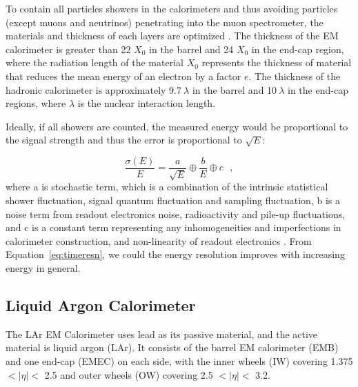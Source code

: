 \par To contain all particles showers in the calorimeters and thus avoiding particles (except muons and neutrinos) penetrating into the muon spectrometer, the materials and thickness of each layers are optimized \cite{Aad:1129811}. The thickness of the EM calorimeter is greater than 22 $X_0$ in the barrel and 24 $X_0$ in the end-cap region, where the radiation length of the material $X_0$ represents the thickness of material that reduces the mean energy of an electron by a factor $e$. The thickness of the hadronic calorimeter is approximately 9.7$~\lambda$ in the barrel and 10$~\lambda$ in the end-cap regions, where $\lambda$ is the nuclear interaction length.

\par Ideally, if all showers are counted, the measured energy would be proportional to the signal strength and thus the error is proportional to $\sqrt{E}$:

\begin{equation}
\label{eq:timeresn}
\frac{\sigma(E)}{E} = \frac{a}{\sqrt{E}} \oplus \frac{b}{E} \oplus c \ \ \  ,
\end{equation}
where a is stochastic term, which is a combination of the intrinsic statistical shower fluctuation, signal quantum fluctuation and sampling fluctuation, b is a noise term from readout electronics noise, radioactivity and pile-up fluctuations, and c is a constant term representing any inhomogeneities and imperfections in calorimeter construction, and non-linearity of readout electronics \cite{calorimetry}. From Equation~\ref{eq:timeresn}, we could the energy resolution improves with increasing energy in general.

\subsection{Liquid Argon Calorimeter}

\par The LAr EM Calorimeter uses lead as its passive material, and the active material is liquid argon (LAr). 
It consists of the barrel EM calorimeter (EMB) and one end-cap (EMEC) on each side, with the inner wheels (IW) covering 1.375 $< |\eta| <$ 2.5 and outer wheels (OW) covering 2.5 $< |\eta| <$ 3.2.

